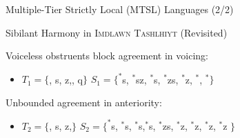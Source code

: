 \documentclass[xcolor={usenames,svgnames,x11names,table}]{beamer}
\begin{document}
\begin{frame}{Multiple-Tier Strictly Local (MTSL) Languages (2/2)} %

        \begin{exampleblock}{Sibilant Harmony in \textsc{Imdlawn Tashlhiyt} (Revisited)}
        
        Voiceless obstruents block agreement in voicing:\\
        \begin{itemize}
        \item   $T_1 = \{$\textit{\textctyogh}, s, z,\textit{\textesh}, q$\}$  $S_1= \{^*$s\textctyogh, $^*$sz, $^*$\textctyogh s,  $^*$zs, $^*$\textesh z, $^*$\textesh  \textctyogh, $^*$\textctyogh \textesh$\}$
         
        \end{itemize}
        
        Unbounded agreement in anteriority:\\
        \begin{itemize}
        \item   $T_2 = \{$\textit{\textctyogh}, s, z,\textit{\textesh}$ \}$ $S_2= \{^*$s\textctyogh, $^*$s\textesh, $^*$\textctyogh s,$^*$\textesh s,  $^*$zs, $^*$z\textesh,  $^*$z\textctyogh, $^*$\textesh z, $^*$\textctyogh z $\}$
        \end{itemize}
        
        \end{exampleblock}

        \begin{center}
        \begin{tikzpicture}%
        

\end{tikzpicture}
\end{center}
\end{frame}
\end{document}
